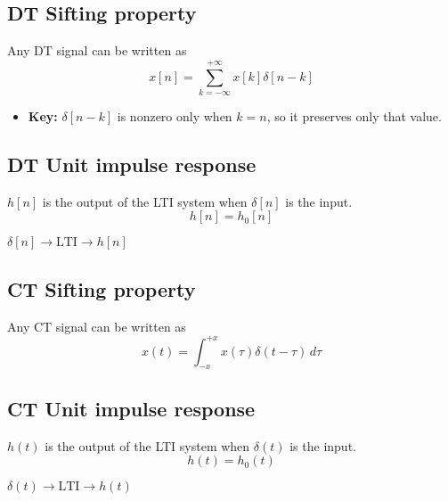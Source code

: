 \subsection{DT Sifting property}
\begin{definition}
    Any DT signal can be written as 
    \begin{equation}
        x[n] = \sum_{k=-\infty}^{+\infty} x[k]\delta [n-k]
    \end{equation}
    \begin{itemize}
        \item \textbf{Key:} $\delta [n-k]$ is nonzero only when $k=n$, so it preserves only that value. 
    \end{itemize}
\end{definition}

\subsection{DT Unit impulse response}
\begin{definition}
    $h[n]$ is the output of the LTI system when $\delta [n]$ is the input.
    \begin{equation}
        h[n] = h_0 [n]
    \end{equation}
\end{definition}

\begin{intuition}
    $\delta[n] \rightarrow \text{LTI} \rightarrow h[n]$
\end{intuition}

\subsection{CT Sifting property}
\begin{definition}
    Any CT signal can be written as
    \begin{equation}
        x(t) = \int_{-x}^{+x} x(\tau) \delta(t - \tau) \, d\tau
    \end{equation}
\end{definition}

\subsection{CT Unit impulse response}
\begin{definition}
    $h(t)$ is the output of the LTI system when $\delta (t)$ is the input.
    \begin{equation}
        h(t) = h_0 (t)
    \end{equation}
\end{definition}

\begin{intuition}
    $\delta(t) \rightarrow \text{LTI} \rightarrow h(t)$
\end{intuition}
